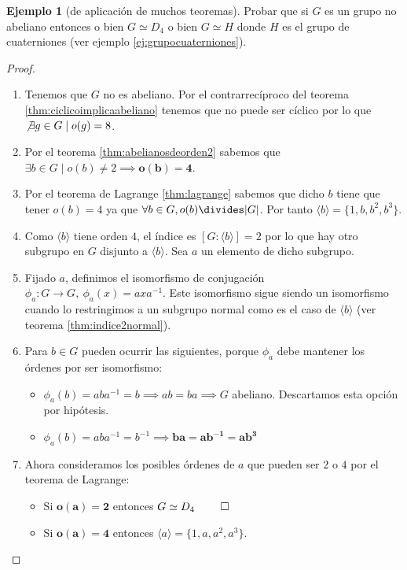 \documentclass{book}
\theoremstyle{definition}
\newtheorem{ej}{Ejemplo}
\theoremstyle{remark}
\newcommand{\inv}[1]{#1^{-1}}
\newcommand{\isom}{\simeq}
\begin{document}
\begin{ej}[de aplicación de muchos teoremas]
	\label{ej:orden8noabisom}
	Probar que si $G$ es un grupo no abeliano entonces o bien $G \isom D_4$ o bien $G \isom H$ donde $H$ es el grupo de cuaterniones (ver ejemplo \ref{ej:grupocuaterniones}).
\end{ej}

\begin{proof}$ $\newline
	\begin{enumerate}
		\item Tenemos que $G$ no es abeliano. Por el contrarrecíproco del teorema \ref{thm:ciclicoimplicaabeliano} tenemos que no puede ser cíclico por lo que $\not\exists g \in G \mid o(g) = 8$.
		\item Por el teorema \ref{thm:abelianosdeorden2} sabemos que $\exists b \in G \mid o(b) \neq 2 \implies \mathbf{o(b) = 4}$.
		\item Por el teorema de Lagrange \ref{thm:lagrange} sabemos que dicho $b$ tiene que tener $o(b) = 4$ ya que $\forall b \in G, o(b) \divides |G|$. Por tanto $\langle b \rangle = \{1, b, b^2, b^3\}$.
		\item Como $\langle b \rangle$ tiene orden $4$, el índice es $[G: \langle b \rangle] = 2$ por lo que hay otro subgrupo en $G$ disjunto a $\langle b \rangle$. Sea $a$ un elemento de dicho subgrupo.
		\item Fijado $a$, definimos el isomorfismo de conjugación $\phi_a: G \to G,\ \phi_a(x) = ax\inv{a}$. Este isomorfismo sigue siendo un isomorfismo cuando lo restringimos a un subgrupo normal como es el caso de $\langle b \rangle$ (ver teorema \ref{thm:indice2normal}).
		\item Para $b \in G$ pueden ocurrir las siguientes, porque $\phi_a$ debe mantener los órdenes por ser isomorfismo:
		\begin{itemize}
			\item $\phi_a(b) = ab\inv{a} = b \implies ab = ba \implies G$ abeliano. Descartamos esta opción por hipótesis.
			\item $\phi_a(b) = ab\inv{a} = \inv{b} \implies \mathbf{ba = a\inv{b} = ab^3}$
		\end{itemize}
		\item Ahora consideramos los posibles órdenes de $a$ que pueden ser $2$ o $4$ por el teorema de Lagrange:
		\begin{itemize}
			\item Si $\mathbf{o(a) = 2}$ entonces $G \isom D_4\ \qed$
			\item Si $\mathbf{o(a) = 4}$ entonces $\langle a \rangle = \{1, a, a^2, a^3\}$.

\end{itemize}
\end{enumerate}
\end{proof}
\end{document}
